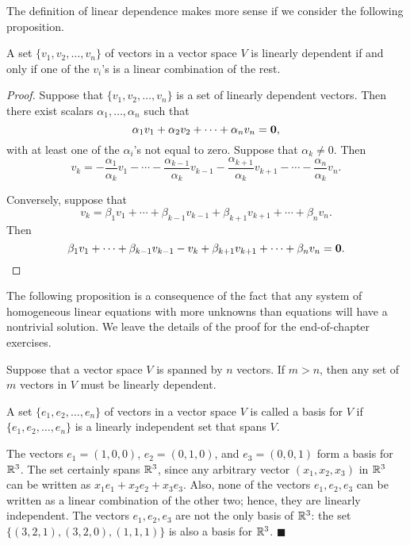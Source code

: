 \vspace{2ex}


The definition of linear dependence makes more sense if we consider
the following proposition.

 
\begin{proposition}
A set $\{ v_1, v_2, \dots, v_n \}$ of vectors in a vector space $V$ is
linearly dependent if and only if one of the $v_i$'s is a linear
combination of the rest. 
\end{proposition}


\begin{proof}
Suppose that $\{ v_1, v_2, \dots, v_n \}$ is a set of linearly dependent
vectors.  Then there exist scalars $\alpha_1, \ldots, \alpha_n$
such that
\[
\alpha_1 v_1 + \alpha_2 v_2 + \cdots + \alpha_n v_n = {\bold 0 },
\]
with at least one of the $\alpha_i$'s not equal to zero.  Suppose that
$\alpha_k \neq 0$. Then 
\[
v_k = - \frac{\alpha_1}{\alpha_k} v_1 
- \cdots 
- \frac{\alpha_{k-1}}{\alpha_k}	v_{k-1}
- \frac{\alpha_{k+1}}{\alpha_k}	v_{k+1}
- \cdots 
- \frac{\alpha_n}{\alpha_k} v_n.
\]


Conversely, suppose that 
\[
v_k = \beta_1 v_1 
+ \cdots 
+ \beta_{k-1} v_{k-1}
+ \beta_{k+1} v_{k+1}
+ \cdots 
+ \beta_n v_n.
\]
Then
\[
\beta_1 v_1 
+ \cdots 
+ \beta_{k-1} v_{k-1}
- v_k
+ \beta_{k+1} v_{k+1}
+ \cdots 
+ \beta_n v_n = {\bold 0}.
\]
\end{proof}

\vspace{2ex}


The following proposition is a consequence of the fact that any system
of homogeneous linear equations with more unknowns than equations will
have a nontrivial solution.  We leave the details of the proof for the
end-of-chapter exercises. 
 

\begin{proposition}
Suppose that a vector space $V$ is spanned by $n$ vectors. If $m > n$,
then any set of $m$ vectors in $V$ must be linearly dependent. 
\end{proposition}
 
  
A set $\{ e_1, e_2, \ldots, e_n \}$ of vectors in a vector space $V$
is called a {\bfi basis\/} for $V$ if $\{
e_1, e_2, \ldots, e_n \}$ is a linearly independent set that spans
$V$.

 
\vspace{2 ex}
 
 
The vectors $e_1 = (1, 0, 0)$, $e_2 = (0, 1, 0)$, and $e_3 =(0, 0, 1)$
form a basis for ${\Bbb R}^3$.  The set certainly spans ${\Bbb R}^3$,
since any arbitrary vector $(x_1, x_2, x_3)$ in ${\Bbb R}^3$ can be
written as $x_1 e_1 + x_2 e_2 + x_3 e_3$. Also, none of the vectors
$e_1, e_2, e_3$ can be written as a linear combination of the other
two; hence, they are linearly independent.  The vectors $e_1, e_2,
e_3$ are not the only basis of ${\Bbb R}^3$:  the set $\{ (3, 2, 1),
(3, 2, 0), (1, 1, 1) \}$ is also a basis for ${\Bbb R}^3$. 
\hspace{\fill} $\blacksquare$

